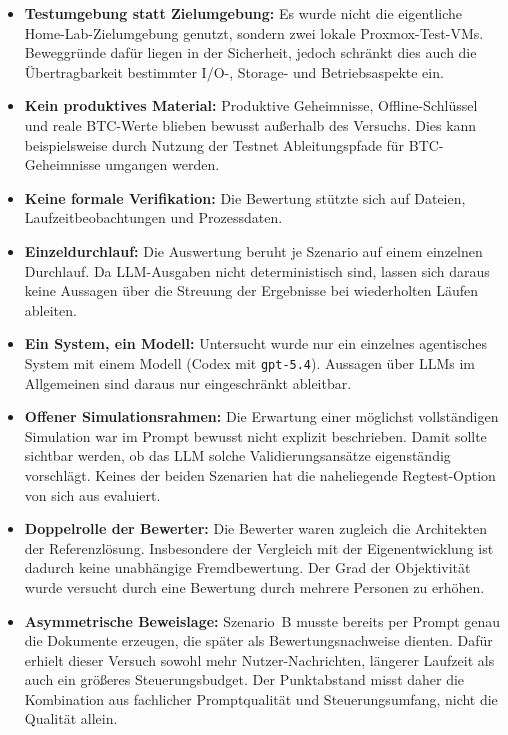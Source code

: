 {\begin{itemize}
\item \textbf{Testumgebung statt Zielumgebung:} Es wurde nicht die eigentliche
Home-Lab-Zielumgebung genutzt, sondern zwei lokale Proxmox-Test-\acp{VM}. Beweggründe dafür liegen in der Sicherheit, jedoch schränkt dies auch die Übertragbarkeit bestimmter I/O-, Storage- und Betriebsaspekte ein.
\item \textbf{Kein produktives Material:} Produktive Geheimnisse, Offline-Schlüssel und reale \ac{BTC}-Werte blieben bewusst außerhalb des Versuchs. Dies kann beispielsweise durch Nutzung der Testnet Ableitungspfade für \ac{BTC}-Geheimnisse umgangen werden.
\item \textbf{Keine formale Verifikation:} Die Bewertung stützte sich auf Dateien, Laufzeitbeobachtungen und Prozessdaten.
\item \textbf{Einzeldurchlauf:} Die Auswertung beruht je Szenario auf einem einzelnen Durchlauf. Da \acs{LLM}-Ausgaben nicht deterministisch sind, lassen sich daraus keine Aussagen über die Streuung der Ergebnisse bei wiederholten Läufen ableiten.
\item \textbf{Ein System, ein Modell:} Untersucht wurde nur ein einzelnes agentisches System mit einem Modell (Codex mit \texttt{gpt-5.4}). Aussagen über \acs{LLM}s im Allgemeinen sind daraus nur eingeschränkt ableitbar.
\item \textbf{Offener Simulationsrahmen:} Die Erwartung einer möglichst vollständigen Simulation war im Prompt bewusst nicht explizit beschrieben. Damit sollte sichtbar werden, ob das \ac{LLM} solche Validierungsansätze eigenständig vorschlägt. Keines der beiden Szenarien hat die naheliegende Regtest-Option von sich aus evaluiert.
\item \textbf{Doppelrolle der Bewerter:} Die Bewerter waren zugleich die Architekten der Referenzlösung. Insbesondere der Vergleich mit der Eigenentwicklung ist dadurch keine unabhängige Fremdbewertung. Der Grad der Objektivität wurde versucht durch eine Bewertung durch mehrere Personen zu erhöhen.
\item \textbf{Asymmetrische Beweislage:} Szenario~B musste bereits per Prompt genau die Dokumente erzeugen, die später als Bewertungsnachweise dienten. Dafür erhielt dieser Versuch sowohl mehr Nutzer-Nachrichten, längerer Laufzeit als auch ein größeres Steuerungsbudget. Der Punktabstand misst daher die Kombination aus fachlicher Promptqualität und Steuerungsumfang, nicht die Qualität allein.
\end{itemize}

}
